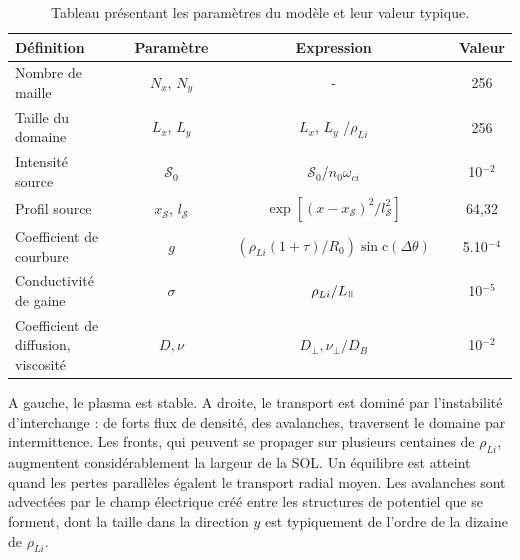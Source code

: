 \begin{refsection}
\begin{table}[!htbp]
\footnotesize\centering
{}
\begin{tabular}{@{}lcccccc@{}}\toprule
Définition&&Paramètre&&Expression&&Valeur\\
\midrule 
Nombre de maille&&$N_x$, $N_y$ && - && 256\\
Taille du domaine&&$L_x$, $L_y$ &&$L_x$, $L_y$ /$\rho_{Li}$ && 256\\
Intensité source&&$\mathcal{S}_0$ &&
$\mathcal{S}_0$/$n_0\omega_{ci}$
&& 10$^{-2}$\\
Profil source&& $x_\mathcal{S}$,
$l_\mathcal{S}$ && $\exp[(x-x_\mathcal{S})^2/l_\mathcal{S}^2]$
&& 64,32\\
Coefficient de courbure&&$g$ &&
$(\rho_{Li}(1+\tau)/R_0)\sin\text{c}(\Delta\theta)$\footnotemark &&
5.10$^{-4}$\\
Conductivité de gaine&&$\sigma$ &&
$\rho_{Li}/L_\para$ &&
10$^{-5}$\\
Coefficient de diffusion, viscosité&&$D,\nu$ &&
$D_\perp,\nu_\perp/D_B$ &&
10$^{-2}$\\
\bottomrule
\end{tabular}
\caption{Tableau présentant les paramètres du modèle et
leur valeur typique.}\label{2-TokamParam}
\end{table}


A gauche, le plasma est stable. A droite, le transport est dominé par l'instabilité d'interchange : de
forts flux de densité, des avalanches, traversent le domaine par intermittence.
Les fronts, qui peuvent se propager sur plusieurs centaines de
$\rho_{Li}$, augmentent considérablement la largeur de la SOL.
Un équilibre est atteint quand les pertes parallèles égalent le transport
radial moyen.
Les avalanches sont advectées par le champ électrique créé entre les structures
de potentiel que se forment, dont la taille dans la direction $y$ est
typiquement de l'ordre de la dizaine de $\rho_{Li}$.


\end{refsection}
